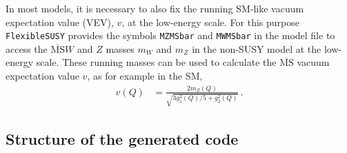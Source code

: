 \documentclass[final,3p,11pt,pdflatex]{elsarticle}
\makeatletter
\newcommand{\fs}{\texttt{FlexibleSUSY}\@\xspace}
\newcommand{\code}[1]{\lstinline|#1|}  %
\newcommand{\ol}[1]{\overline{#1}}
\newcommand{\MSbar}{\ensuremath{\ol{\text{MS}}}\xspace}
\makeatother
\begin{document}
In most models, it is necessary to also fix the running SM-like vacuum
expectation value (VEV), $v$, at the low-energy scale.  For this purpose \fs
provides the symbols \code{MZMSbar} and \code{MWMSbar} in the model
file to access the \MSbar $W$ and $Z$ masses $m_W$ and $m_Z$ in the
non-SUSY model at the low-energy scale.  These running masses can be
used to calculate the \MSbar vacuum expectation value $v$, as for
example in the SM,
%
\begin{align}
  v(Q) &= \frac{2 m_Z(Q)}{\sqrt{3 g_1^2(Q) / 5+ g_2^2(Q)}} \,.
\end{align}

\subsection{Structure of the generated code}
\end{document}
